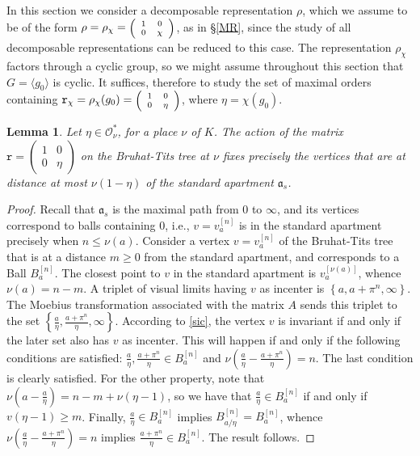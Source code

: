 \documentclass{article}
\newtheorem{Lem}[Prop]{Lemma}
\theoremstyle{definition}
\theoremstyle{remark}
\newcommand\sbmattrix[4]{\textnormal{\scriptsize$\left(\begin{array}{cc}#1&#2\\#3&#4\end{array}\right)$\normalsize}}
\begin{document}
In this section we consider a decomposable representation 
$\rho$, which we assume to be of the form 
$\rho=\rho_\chi=\sbmattrix 100{\chi}$,
as in \S\ref{MR}, since the study of all
decomposable representations can be reduced to this
case. The representation $\rho_\chi$
factors through a cyclic group, so we might assume throughout
this section that $G=\langle g_0\rangle$ is cyclic.
It suffices, therefore to study the set of maximal orders
containing $\mathtt{r}_\chi=\rho_\chi(g_0)=
\sbmattrix 100{\eta}$,
where $\eta=\chi(g_0)$.

\begin{Lem}\label{l61}
    Let $\eta \in \mathcal{O}_\nu^* $, for a place $\nu$ 
    of $K$. The action of the matrix 
    $\mathtt{r}=\begin{pmatrix} 1&0\\0&\eta \end{pmatrix}$ 
    on the Bruhat-Tits tree at $\nu$
    fixes precisely the vertices that are at distance at most 
    $\nu(1-\eta )$ of the standard apartment
    $\mathfrak{a}_s$.
\end{Lem}
\begin{proof}
    Recall that $\mathfrak{a}_s$ is the maximal
    path from $0$ to $\infty$,
    and its vertices correspond to balls containing $0$, i.e.,
    $v=v_a^{[n]}$ is in the standard apartment precisely 
    when $n\leq\nu(a)$.
    Consider a vertex $v=v_a^{[n]}$ of the 
    Bruhat-Tits tree that is 
    at a distance $m\geq0$ from the 
    standard apartment, and corresponds
    to a Ball $B_a^{[n]}$. The closest point to $v$
    in the standard apartment is $v_a^{[\nu(a)]}$, whence
    $\nu(a)=n-m$. A triplet of visual limits having $v$
    as incenter is $\left\lbrace a, a+\pi^n, 
    \infty\right\rbrace$. 
    The Moebius transformation associated with the matrix $A$ 
    sends this triplet to the set $\left\lbrace \frac{a}
    {\eta },\frac{a+\pi^n}{\eta },\infty\right\rbrace$.
    According to \ref{sic}, the vertex $v$ 
    is invariant if and only 
    if the later set also has $v$ as incenter.
      This will happen if and only if 
      the following conditions are 
      satisfied: $\frac{a}{\eta }, 
      \frac{a+\pi^n}{\eta }\in B_a^{[n]}$ 
      and $\nu\left(\frac{a}{\eta }-
      \frac{a+\pi^n}{\eta }\right)=n$. 
      The last 
      condition is clearly satisfied. For the 
      other property, note 
      that $\nu\left(a-\frac{a}{\eta }\right)=
      n-m+\nu(\eta -1)$, so we have 
      that $\frac{a}{\eta }\in B_a^{[n]}$ if and only if 
      $v(\eta -1)\geq m$. Finally, 
      $\frac{a}{\eta }\in B_a^{[n]}$ implies
      $B_{a/\eta }^{[n]}=B_a^{[n]}$, whence
      $\nu\left(\frac{a}{\eta }-
      \frac{a+\pi^n}{\eta }\right)=n$ implies
      $\frac{a+\pi^n}{\eta }\in B_a^{[n]}$. The result follows.
\end{proof}
\end{document}
